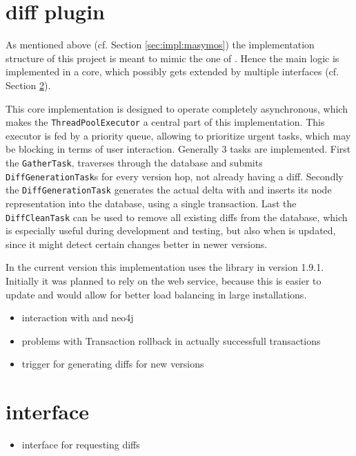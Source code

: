 	\begin{comment}
	\begin{itemize}
		\item generic ontology import for COMODI
		\item some helper methods/functions
	\end{itemize}
	\end{comment}

\section{\masymos diff plugin}
	\label{sec:impl:diff}
	As mentioned above (cf. Section \ref{sec:impl:masymos}) the implementation structure of this project is meant to mimic the one of \masymos. Hence the main logic is implemented in a core, which possibly gets extended by multiple interfaces (cf. Section \ref{sec:impl:rest}).
	
	This core implementation is designed to operate completely asynchronous, which makes the \texttt{ThreadPoolExecutor} a central part of this implementation. This executor is fed by a priority queue, allowing to prioritize urgent tasks, which may be blocking in terms of user interaction.
	Generally 3 tasks are implemented. First the \texttt{GatherTask}, traverses through the database and submits \texttt{DiffGenerationTask}s for every version hop, not already having a diff.
	Secondly the \texttt{DiffGenerationTask} generates the actual delta with \bives and inserts its node representation into the database, using a single transaction.
	Last the \texttt{DiffCleanTask} can be used to remove all existing diffs from the database, which is especially useful during development and testing, but also when \bives is updated, since it might detect certain changes better in newer versions.
	
	In the current version this implementation uses the \bives library in version 1.9.1. Initially it was planned to rely on the \bives web service, because this is easier to update and would allow for better load balancing in large installations.
	
	\begin{itemize}
		\item interaction with \bives and neo4j
		\item problems with Transaction rollback in actually successfull transactions
		\item trigger for generating diffs for new versions
	\end{itemize}

\section{\rest interface}
	\label{sec:impl:rest}
	\begin{itemize}
		\item \rest interface for requesting diffs
	\end{itemize}

